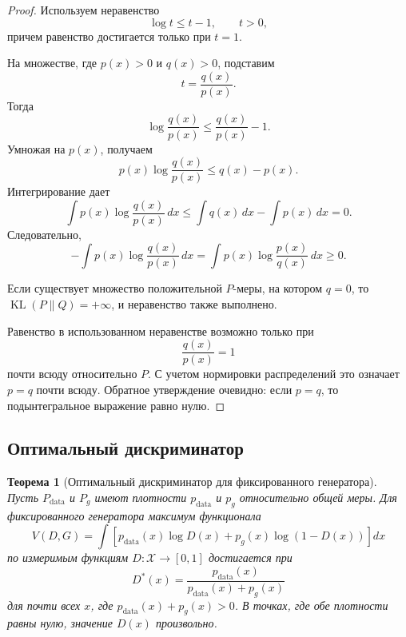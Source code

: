 \documentclass[12pt,a4paper]{article}
\newcommand{\KL}{\operatorname{KL}}
\numberwithin{equation}{section}
\newtheorem{theorem}{Теорема}[section]
\theoremstyle{definition}
\theoremstyle{remark}
\begin{document}
\begin{proof}
Используем неравенство
\[
    \log t\leq t-1,
    \qquad t>0,
\]
причем равенство достигается только при \(t=1\).

На множестве, где \(p(x)>0\) и \(q(x)>0\), подставим
\[
    t=\frac{q(x)}{p(x)}.
\]
Тогда
\[
    \log\frac{q(x)}{p(x)}
    \leq
    \frac{q(x)}{p(x)}-1.
\]
Умножая на \(p(x)\), получаем
\[
    p(x)\log\frac{q(x)}{p(x)}
    \leq
    q(x)-p(x).
\]
Интегрирование дает
\[
    \int p(x)\log\frac{q(x)}{p(x)}\,dx
    \leq
    \int q(x)\,dx-\int p(x)\,dx=0.
\]
Следовательно,
\[
    -\int p(x)\log\frac{q(x)}{p(x)}\,dx
    =
    \int p(x)\log\frac{p(x)}{q(x)}\,dx
    \geq 0.
\]

Если существует множество положительной \(P\)-меры, на котором
\(q=0\), то \(\KL(P\|Q)=+\infty\), и неравенство также выполнено.

Равенство в использованном неравенстве возможно только при
\[
    \frac{q(x)}{p(x)}=1
\]
почти всюду относительно \(P\). С учетом нормировки распределений это
означает \(p=q\) почти всюду. Обратное утверждение очевидно:
если \(p=q\), то подынтегральное выражение равно нулю.
\end{proof}

\subsection{Оптимальный дискриминатор}

\begin{theorem}[Оптимальный дискриминатор для фиксированного генератора]
Пусть \(P_{\mathrm{data}}\) и \(P_g\) имеют плотности
\(p_{\mathrm{data}}\) и \(p_g\) относительно общей меры. Для
фиксированного генератора максимум функционала
\[
    V(D,G)
    =
    \int
    \left[
        p_{\mathrm{data}}(x)\log D(x)
        +
        p_g(x)\log(1-D(x))
    \right]dx
\]
по измеримым функциям \(D:\mathcal{X}\to[0,1]\) достигается при
\[
    D^*(x)
    =
    \frac{
        p_{\mathrm{data}}(x)
    }{
        p_{\mathrm{data}}(x)+p_g(x)
    }
\]
для почти всех \(x\), где
\(p_{\mathrm{data}}(x)+p_g(x)>0\). В точках, где обе плотности равны
нулю, значение \(D(x)\) произвольно.
\end{theorem}
\end{document}
